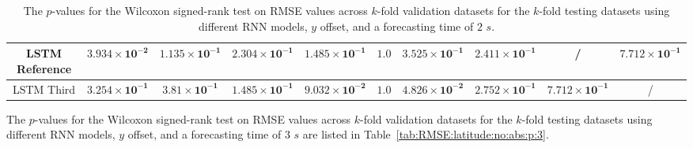 \begin{table}[!ht]
{\begin{tabular}{|c|c|c|c|c|c|c|c|c|c|}
			LSTM Reference & $\mathbf{3.934 \times 10^{-2}}$ & $\mathbf{1.135 \times 10^{-1}}$ & $\mathbf{2.304 \times 10^{-1}}$ & $\mathbf{1.485 \times 10^{-1}}$ & $\mathbf{1.0}$ & $\mathbf{3.525 \times 10^{-1}}$ & $\mathbf{2.411 \times 10^{-1}}$ & / & $\mathbf{7.712 \times 10^{-1}}$ \\ \hline
			LSTM Third & $\mathbf{3.254 \times 10^{-1}}$ & $\mathbf{3.81 \times 10^{-1}}$ & $\mathbf{1.485 \times 10^{-1}}$ & $\mathbf{9.032 \times 10^{-2}}$ & $\mathbf{1.0}$ & $\mathbf{4.826 \times 10^{-2}}$ & $\mathbf{2.752 \times 10^{-1}}$ & $\mathbf{7.712 \times 10^{-1}}$ & / \\ \hline
		\end{tabular}
	}
	\caption{The $p$-values for the Wilcoxon signed-rank test on RMSE values across $k$-fold validation datasets for the $k$-fold testing datasets using different RNN models, $y$ offset, and a forecasting time of $2$ $s$.}
	\label{tab:RMSE:latitude:no:abs:p:2}
\end{table}

The $p$-values for the Wilcoxon signed-rank test on RMSE values across $k$-fold validation datasets for the $k$-fold testing datasets using different RNN models, $y$ offset, and a forecasting time of $3$ $s$ are listed in Table~\ref{tab:RMSE:latitude:no:abs:p:3}.

